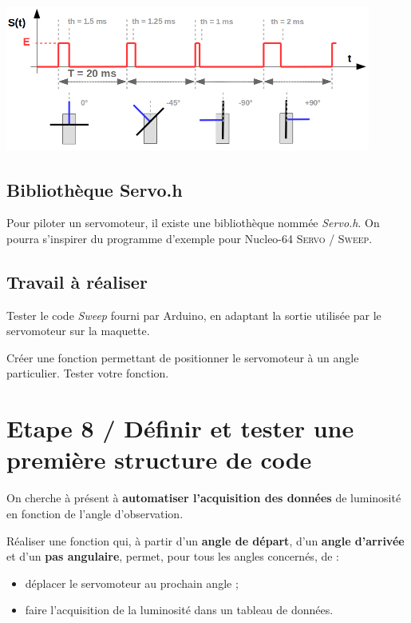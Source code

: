 \documentclass[a4paper,11pt,titlepage]{article} %
\begin{document}
\begin{center}
	\includegraphics[width=0.9\textwidth]{images/MINE_Nucleo_servomoteur.png}
\end{center}

\subsection{Bibliothèque Servo.h}

Pour piloter un servomoteur, il existe une bibliothèque nommée \textsl{Servo.h}. On pourra s'inspirer du programme d'exemple pour Nucleo-64 \textsc{Servo / Sweep}.


\subsection{Travail à réaliser}

\Manip Tester le code \textsl{Sweep} fourni par Arduino, en adaptant la sortie utilisée par le servomoteur sur la maquette.

\Manip Créer une fonction permettant de positionner le servomoteur à un angle particulier. Tester votre fonction. 


\section{Etape 8 / Définir et tester une première structure de code}

On cherche à présent à \textbf{automatiser l'acquisition des données} de luminosité en fonction de l'angle d'observation.

\Manip Réaliser une fonction qui, à partir d'un \textbf{angle de départ}, d'un \textbf{angle d'arrivée} et d'un \textbf{pas angulaire}, permet, pour tous les angles concernés, de :

\begin{itemize}
	\item déplacer le servomoteur au prochain angle ;
	\item faire l'acquisition de la luminosité dans un tableau de données.
\end{itemize}
\end{document}

